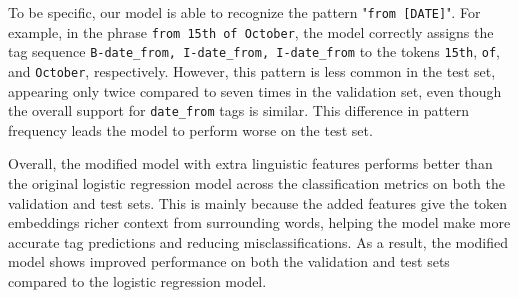 \documentclass[11pt,a4paper]{article}
\begin{document}
To be specific, our model is able to recognize the pattern "\texttt{from [DATE]}". For example, in the phrase \texttt{from 15th of October}, the model correctly assigns the tag sequence \texttt{B-date\_from, I-date\_from, I-date\_from} to the tokens \texttt{15th}, \texttt{of}, and \texttt{October}, respectively. However, this pattern is less common in the test set, appearing only twice compared to seven times in the validation set, even though the overall support for \texttt{date\_from} tags is similar. This difference in pattern frequency leads the model to perform worse on the test set.

Overall, the modified model with extra linguistic features performs better than the original logistic regression model across the classification metrics on both the validation and test sets. This is mainly because the added features give the token embeddings richer context from surrounding words, helping the model make more accurate tag predictions and reducing misclassifications. As a result, the modified model shows improved performance on both the validation and test sets compared to the logistic regression model.
\iffalse

\begin{itemize}
    \item i slept in and will have to check out later than 6 -> model optimize for 6 hours
    \item change hotel booking, my name is edens -> spacy doesnt recognize edens as PER, and model relies on that
    \item Have you got any availability between 17th May to 21st May, we are three for a four night stay -> model optimize for word "for", doesnt do well with between
    \item She's arriving on Wednesday and will be staying until Sunday next week. -> doesnt seem to work with until as well
    \item model was optimize to work well with examples "from date/time" "to date/time", however in the test data this pattern occurs much less time (from went from 7 to 2 examples)
\end{itemize}


\fi
 
\end{document}
